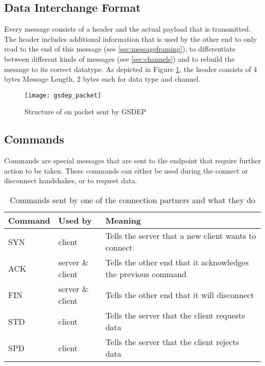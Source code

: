 \subsection{Data Interchange Format}

Every message consists of a header and the actual payload that is transmitted. The header includes additional information that is used by the other end to only read to the end of this message (see \ref{sec:messageframing}), to differentiate between different kinds of messages (see \ref{sec:channels}) and to rebuild the message to its correct datatype. As depicted in Figure \ref{fig:packet}, the header consists of 4 bytes Message Length, 2 bytes each for data type and channel.

\begin{figure}[H]
	\centering
	\texttt{[image: gsdep\_packet]}
	\caption{Structure of on packet sent by GSDEP}
	\label{fig:packet}
\end{figure}

\subsection{Commands}

Commands are special messages that are sent to the endpoint that require further action to be taken. These commands can either be used during the connect or disconnect handshakes, or to request data.

\begin{table}[H]
	\centering
	\begin{tabular}{| l | l | p{5cm} |}
	\hline
	\textbf{Command} & \textbf{Used by} & \textbf{Meaning} \\ \hline
	SYN & client & Tells the server that a new client wants to connect \\ \hline
	ACK & server \& client & Tells the other end that it acknowledges the previous command \\ \hline
	FIN & server \& client & Tells the other end that it will disconnect \\ \hline
	STD & client & Tells the server that the client requests data\\ \hline
	SPD & client & Tells the server that the client rejects data\\
	\hline
	\end{tabular}
	\caption{Commands sent by one of the connection partners and what they do}
	\label{tab:commands}
\end{table}


